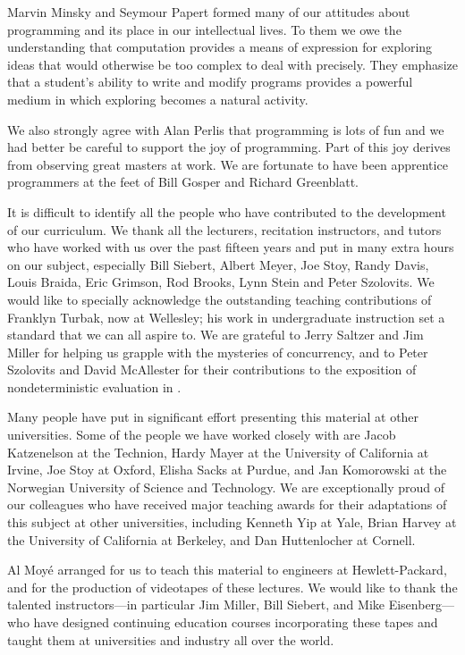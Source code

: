 Marvin Minsky and Seymour Papert formed many of our attitudes about programming
and its place in our intellectual lives.  To them we owe the understanding that
computation provides a means of expression for exploring ideas that would
otherwise be too complex to deal with precisely.  They emphasize that a
student's ability to write and modify programs provides a powerful medium in
which exploring becomes a natural activity.

We also strongly agree with Alan Perlis that programming is lots of fun and we
had better be careful to support the joy of programming.  Part of this joy
derives from observing great masters at work.  We are fortunate to have been
apprentice programmers at the feet of Bill Gosper and Richard Greenblatt.

It is difficult to identify all the people who have contributed to the
development of our curriculum.  We thank all the lecturers, recitation
instructors, and tutors who have worked with us over the past fifteen years and
put in many extra hours on our subject, especially Bill Siebert, Albert Meyer,
Joe Stoy, Randy Davis, Louis Braida, Eric Grimson, Rod Brooks, Lynn Stein and
Peter Szolovits.  We would like to specially acknowledge the outstanding
teaching contributions of Franklyn Turbak, now at Wellesley; his work in
undergraduate instruction set a standard that we can all aspire to.  We are
grateful to Jerry Saltzer and Jim Miller for helping us grapple with the
mysteries of concurrency, and to Peter Szolovits and David McAllester for their
contributions to the exposition of nondeterministic evaluation in .

Many people have put in significant effort presenting this material at other
universities.  Some of the people we have worked closely with are Jacob
Katzenelson at the Technion, Hardy Mayer at the University of California at
Irvine, Joe Stoy at Oxford, Elisha Sacks at Purdue, and Jan Komorowski at the
Norwegian University of Science and Technology.  We are exceptionally proud of
our colleagues who have received major teaching awards for their adaptations of
this subject at other universities, including Kenneth Yip at Yale, Brian Harvey
at the University of California at Berkeley, and Dan Huttenlocher at Cornell.

Al Moy\'e arranged for us to teach this material to engineers at
Hewlett-Packard, and for the production of videotapes of these lectures.  We
would like to thank the talented instructors---in particular Jim Miller, Bill
Siebert, and Mike Eisenberg---who have designed continuing education courses
incorporating these tapes and taught them at universities and industry all over
the world.

